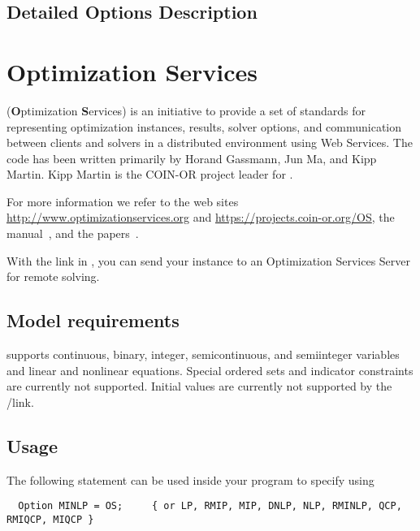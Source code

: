 \subsection{Detailed Options Description}
\label{sub:ipoptoptions}




\section{Optimization Services}

\OS (\textbf{O}ptimization \textbf{S}ervices) is an initiative to provide a set of standards for representing optimization instances, results, solver options, and communication between clients and solvers in a distributed environment using Web Services.
The code has been written primarily by Horand Gassmann, Jun Ma, and Kipp Martin.
Kipp Martin is the COIN-OR project leader for \OS.

For more information we refer to the web sites \url{http://www.optimizationservices.org} and \url{https://projects.coin-or.org/OS}, the \OS manual~\cite{Ma2005}, and the papers~\cite{FourerMaMartin2009,FourerMaMartin2010,OSManual}.

With the \OS link in \GAMS, you can send your instance to an Optimization Services Server for remote solving.

\subsection{Model requirements}

\OS supports continuous, binary, integer, semicontinuous, and semiinteger variables and linear and nonlinear equations.
Special ordered sets and indicator constraints are currently not supported.
Initial values are currently not supported by the \GAMS/\OS link.

\subsection{Usage}

The following statement can be used inside your \GAMS program to specify using \OS
\begin{verbatim}
  Option MINLP = OS;     { or LP, RMIP, MIP, DNLP, NLP, RMINLP, QCP, RMIQCP, MIQCP }
\end{verbatim}

